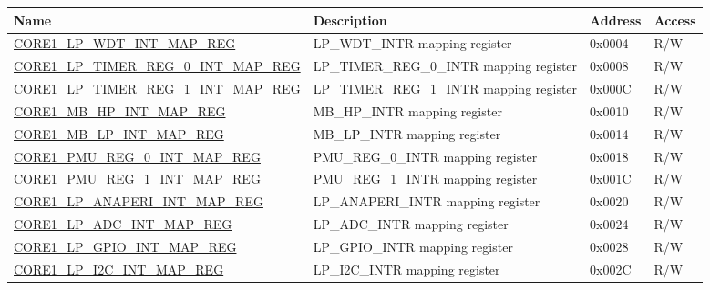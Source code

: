 \begin{longtable}{ | p{7.5cm} | p{7.2cm} | p{1.3cm} | p{1cm} | }
\hline\rowcolor{lightgray}
Name & Description &  Address & Access \\ \hline
\endhead

\hyperref[regdesc:CORE1LPWDTINTMAPREG]{CORE1\_LP\_WDT\_INT\_MAP\_REG} & LP\_WDT\_INTR mapping register & 0x0004 & R/W \\ \hline

\hyperref[regdesc:CORE1LPTIMERREG0INTMAPREG]{CORE1\_LP\_TIMER\_REG\_0\_INT\_MAP\_REG} & LP\_TIMER\_REG\_0\_INTR mapping register & 0x0008 & R/W \\ \hline

\hyperref[regdesc:CORE1LPTIMERREG1INTMAPREG]{CORE1\_LP\_TIMER\_REG\_1\_INT\_MAP\_REG} & LP\_TIMER\_REG\_1\_INTR mapping register & 0x000C & R/W \\ \hline

\hyperref[regdesc:CORE1MBHPINTMAPREG]{CORE1\_MB\_HP\_INT\_MAP\_REG} & MB\_HP\_INTR mapping register & 0x0010 & R/W \\ \hline

\hyperref[regdesc:CORE1MBLPINTMAPREG]{CORE1\_MB\_LP\_INT\_MAP\_REG} & MB\_LP\_INTR mapping register & 0x0014 & R/W \\ \hline

\hyperref[regdesc:CORE1PMUREG0INTMAPREG]{CORE1\_PMU\_REG\_0\_INT\_MAP\_REG} & PMU\_REG\_0\_INTR mapping register & 0x0018 & R/W \\ \hline

\hyperref[regdesc:CORE1PMUREG1INTMAPREG]{CORE1\_PMU\_REG\_1\_INT\_MAP\_REG} & PMU\_REG\_1\_INTR mapping register & 0x001C & R/W \\ \hline

\hyperref[regdesc:CORE1LPANAPERIINTMAPREG]{CORE1\_LP\_ANAPERI\_INT\_MAP\_REG} & LP\_ANAPERI\_INTR mapping register & 0x0020 & R/W \\ \hline

\hyperref[regdesc:CORE1LPADCINTMAPREG]{CORE1\_LP\_ADC\_INT\_MAP\_REG} & LP\_ADC\_INTR mapping register & 0x0024 & R/W \\ \hline

\hyperref[regdesc:CORE1LPGPIOINTMAPREG]{CORE1\_LP\_GPIO\_INT\_MAP\_REG} & LP\_GPIO\_INTR mapping register & 0x0028 & R/W \\ \hline

\hyperref[regdesc:CORE1LPI2CINTMAPREG]{CORE1\_LP\_I2C\_INT\_MAP\_REG} & LP\_I2C\_INTR mapping register & 0x002C & R/W \\ \hline


\end{longtable}
